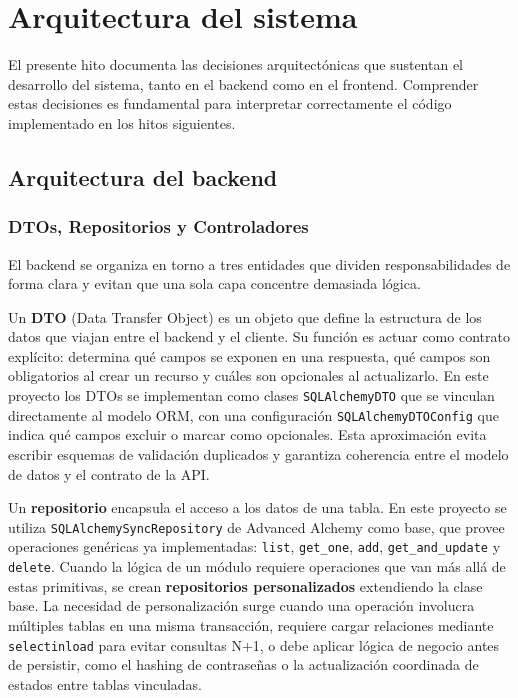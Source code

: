 \section{Arquitectura del sistema}

El presente hito documenta las decisiones arquitectónicas que sustentan el desarrollo 
del sistema, tanto en el backend como en el frontend. Comprender estas decisiones es 
fundamental para interpretar correctamente el código implementado en los hitos 
siguientes.

\subsection{Arquitectura del backend}

\subsubsection*{DTOs, Repositorios y Controladores}

El backend se organiza en torno a tres entidades que dividen responsabilidades de 
forma clara y evitan que una sola capa concentre demasiada lógica.

Un \textbf{DTO} (Data Transfer Object) es un objeto que define la estructura de los 
datos que viajan entre el backend y el cliente. Su función es actuar como contrato 
explícito: determina qué campos se exponen en una respuesta, qué campos son 
obligatorios al crear un recurso y cuáles son opcionales al actualizarlo. En este 
proyecto los DTOs se implementan como clases \texttt{SQLAlchemyDTO} que se vinculan 
directamente al modelo ORM, con una configuración \texttt{SQLAlchemyDTOConfig} que 
indica qué campos excluir o marcar como opcionales. Esta aproximación evita escribir 
esquemas de validación duplicados y garantiza coherencia entre el modelo de datos y 
el contrato de la API.

Un \textbf{repositorio} encapsula el acceso a los datos de una tabla. En este proyecto 
se utiliza \texttt{SQLAlchemySyncRepository} de Advanced Alchemy como base, que 
provee operaciones genéricas ya implementadas: \texttt{list}, \texttt{get\_one}, 
\texttt{add}, \texttt{get\_and\_update} y \texttt{delete}. Cuando la lógica de un 
módulo requiere operaciones que van más allá de estas primitivas, se crean 
\textbf{repositorios personalizados} extendiendo la clase base. La necesidad de 
personalización surge cuando una operación involucra múltiples tablas en una misma 
transacción, requiere cargar relaciones mediante \texttt{selectinload} para evitar 
consultas N+1, o debe aplicar lógica de negocio antes de persistir, como el hashing 
de contraseñas o la actualización coordinada de estados entre tablas vinculadas.

